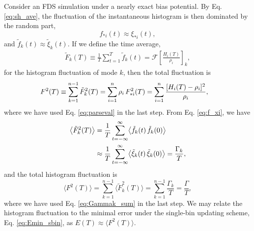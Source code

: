 \documentclass[reprint, superscriptaddress, floatfix]{revtex4-1}
\newcommand{\Err}{E}
\begin{document}

Consider an FDS simulation
under a nearly exact bias potential.
%
By Eq. \eqref{eq:sh_ave},
the fluctuation of the instantaneous histogram
is then dominated by the random part,
%
\begin{equation}
  f_{*i}(t) \approx \xi_{*i}(t)
  ,
  \label{eq:f_xi}
\end{equation}
and
$\tilde f_k(t) \approx \tilde \xi_k(t).$
%
If we define the time average,
%
\begin{align*}
  \tilde F_k(T) \equiv \frac 1 T \sum_{t = 1}^T \tilde f_k(t)
  =\mathcal F\left[ \frac{ H_i(T) } { \rho_i } \right]_k
  ,
\end{align*}
%
for the histogram fluctuation of mode $k$,
then the total fluctuation is
%
\begin{align}
  F^2(T)
  &\equiv
  \sum_{k=1}^{n-1} \tilde F_k^2(T)
  =
  \sum_{i=1}^{n} \rho_i \, F_{*i}^2(T)
  =
  \sum_{i=1}^n
  \frac{ [ H_i(T) -\rho_i]^2 }{\rho_i}
  ,
  \notag
\end{align}
%
where we have used Eq. \eqref{eq:parseval} in the last step.
%
From Eq. \eqref{eq:f_xi}, we have
%
\begin{align}
  \bigl\langle \tilde F_k^2(T) \bigr\rangle
  &=
  \frac{1}{T}
  \sum_{t=-\infty}^\infty
  \bigl\langle
    \tilde f_k(t) \, \tilde f_k(0)
  \bigr\rangle
  \notag \\
  &\approx
  \frac{1}{T}
  \sum_{t=-\infty}^\infty
  \bigl\langle
    \tilde \xi_k(t) \, \tilde \xi_k(0)
  \bigr\rangle
  =
  \frac{ \Gamma_k } { T }
  ,
  \notag
\end{align}
%
and the total histogram fluctuation is
\begin{equation}
  \bigl\langle F^2(T) \bigr\rangle
  =
  \sum_{k=1}^{n-1}
  \bigl\langle \tilde F_k^2(T) \bigr\rangle
  =
  \sum_{k=1}^{n-1}
  \frac{ \Gamma_k } { T }
  =
  \frac{ \Gamma } { T }
  ,
  \label{eq:F2sum}
\end{equation}
where we have used Eq. \eqref{eq:Gammak_sum}
in the last step.
%
We may relate the histogram fluctuation
to the minimal error under the single-bin updating scheme,
Eq. \eqref{eq:Emin_sbin}, as
  $\Err(T) \approx \bigl\langle F^2(T) \bigr\rangle$.
%
\end{document}

